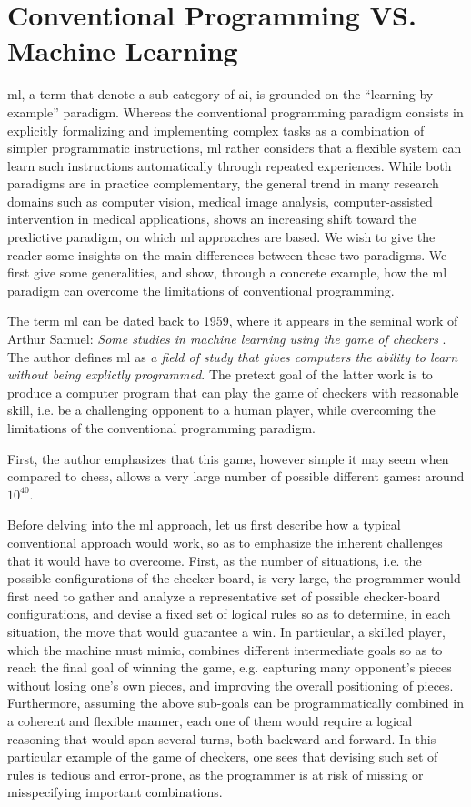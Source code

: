 \section{Conventional Programming VS. Machine Learning}
\Gls{ml}, a term that denote a sub-category of \gls{ai}, is grounded on the ``learning by example'' paradigm.
Whereas the conventional programming paradigm consists in explicitly formalizing and implementing complex tasks as a combination of simpler programmatic instructions,
\gls{ml} rather considers that a flexible system can learn such instructions automatically through repeated experiences.
While both paradigms are in practice complementary, the general trend in many research domains such as computer vision, medical image analysis, computer-assisted intervention in medical applications, shows an increasing shift toward the predictive paradigm, on which \gls{ml} approaches are based.
We wish to give the reader some insights on the main differences between these two paradigms.
We first give some generalities, and show, through a concrete example, how the \gls{ml} paradigm can overcome the limitations of conventional programming.

The term \gls{ml} can be dated back to 1959, where it appears in the seminal work of Arthur Samuel: \textit{Some studies in machine learning using the game of checkers} \cite{samuel59}.
The author defines \gls{ml} as \textit{a field of study that gives computers the ability to learn without being explictly programmed}.
The pretext goal of the latter work is to produce a computer program that can play the game of checkers with reasonable skill, i.e. be a challenging opponent to a human player, while overcoming the limitations of the conventional programming paradigm.

First, the author emphasizes that this game, however simple it may seem when compared to chess, allows a very large number of possible different games: around $10^{40}$.

Before delving into the \gls{ml} approach, let us first describe how a typical conventional approach would work, so as to emphasize the inherent challenges that it would have to overcome.
First, as the number of situations, i.e. the possible configurations of the checker-board, is very large, the programmer would first need to gather and analyze a representative set of possible checker-board configurations, and devise a fixed set of logical rules so as to determine, in each situation, the move that would guarantee a win.
In particular, a skilled player, which the machine must mimic, combines different intermediate goals so as to reach the final goal of winning the game, e.g. capturing many opponent's pieces without losing one's own pieces, and improving the overall positioning of pieces.
Furthermore, assuming the above sub-goals can be programmatically combined in a coherent and flexible manner, each one of them would require a logical reasoning that would span several turns, both backward and forward.
In this particular example of the game of checkers, one sees that devising such set of rules is tedious and error-prone, as the programmer is at risk of missing or misspecifying important combinations.

